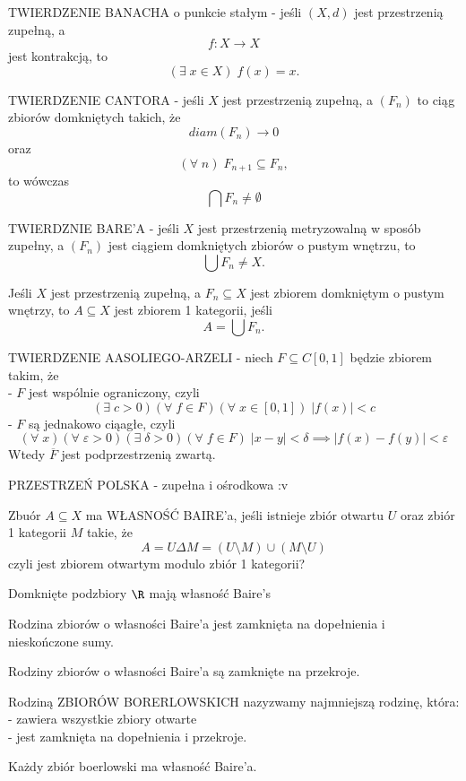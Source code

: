 \documentclass{article}
\begin{document}
    {\large\color{def}TWIERDZENIE BANACHA} o punkcie stałym - jeśli $(X, d)$ jest przestrzenią zupełną, a
    $$f:X\to X$$
    jest kontrakcją, to
    $$(\exists\;x\in X)\;f(x)=x.$$

    {\large\color{def}TWIERDZENIE CANTORA} - jeśli $X$ jest przestrzenią zupełną, a $(F_n)$ to ciąg zbiorów domkniętych takich, że
    $$diam(F_n)\to 0$$
    oraz
    $$(\forall\;n)\;F_{n+1}\subseteq F_n,$$
    to wówczas
    $$\bigcap F_n\neq \emptyset$$

    {\large\color{def}TWIERDZNIE BARE'A} - jeśli $X$ jest przestrzenią metryzowalną w sposób zupełny, a $(F_n)$ jest ciągiem domkniętych zbiorów o pustym wnętrzu, to
    $$\bigcup F_n\neq X.$$

    Jeśli $X$ jest przestrzenią zupełną, a $F_n\subseteq X$ jest zbiorem domkniętym o pustym wnętrzy, to $A\subseteq X$ jest zbiorem 1 kategorii, jeśli
    $$A=\bigcup F_n.$$

    {\large\color{def}TWIERDZENIE AASOLIEGO-ARZELI} - niech $F\subseteq C[0, 1]$ będzie zbiorem takim, że\medskip\\
    \indent - $F$ jest wspólnie ograniczony, czyli
    $$(\exists\;c>0)(\forall\;f\in F)(\forall\;x\in [0, 1])\;|f(x)|<c$$
    \indent - $F$ są jednakowo ciąagłe, czyli
    $$(\forall\;x)(\forall\;\varepsilon>0)(\exists\;\delta>0)(\forall\;f\in F)\;|x-y|<\delta\implies |f(x)-f(y)|<\varepsilon$$
    Wtedy {\color{acc}$\overline F$ jest podprzestrzenią zwartą}.

    {\large\color{def}PRZESTRZEŃ POLSKA} - zupełna i ośrodkowa :v

    Zbuór $A\subseteq X$ ma {\large\color{def}WŁASNOŚĆ BAIRE'a}, jeśli istnieje zbiór otwartu $U$ oraz zbiór 1 kategorii $M$ takie, że
    $$A=U\Delta M=(U\setminus M)\cup (M\setminus U)$$
    czyli jest zbiorem otwartym modulo zbiór 1 kategorii?\medskip

    {\color{acc}Domknięte podzbiory $\R$ mają własność Baire's}\bigskip

    Rodzina zbiorów o własności Baire'a jest {\color{acc}zamknięta na dopełnienia i nieskończone sumy}.\bigskip

    Rodziny zbiorów o własności Baire'a są zamknięte na przekroje.\bigskip

    Rodziną {\large\color{def}ZBIORÓW BORERLOWSKICH} nazyzwamy najmniejszą rodzinę, która:\medskip\\
    \indent - zawiera wszystkie zbiory otwarte\medskip\\
    \indent - jest zamknięta na dopełnienia i przekroje.\bigskip

    Każdy zbiór boerlowski ma własność Baire'a.
\end{document}
